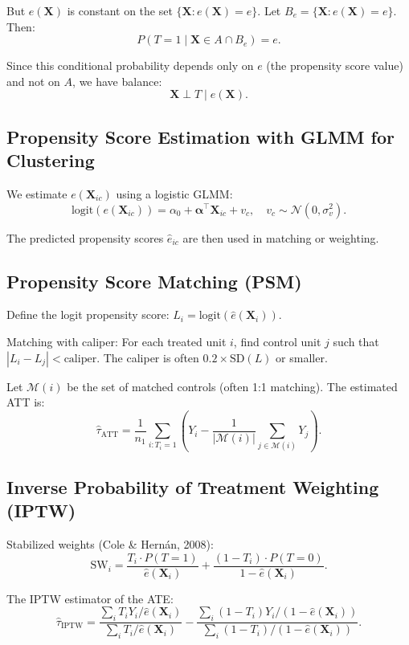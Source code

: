 \documentclass[12pt]{article}
\numberwithin{equation}{section}
\begin{document}
	But $e(\mathbf{X})$ is constant on the set $\{\mathbf{X}: e(\mathbf{X}) = e\}$. Let $B_e = \{\mathbf{X}: e(\mathbf{X}) = e\}$. Then:
	\[
	P(T=1 \mid \mathbf{X} \in A \cap B_e) = e.
	\]
	
	Since this conditional probability depends only on $e$ (the propensity score value) and not on $A$, we have balance:
	\[
	\mathbf{X} \perp T \mid e(\mathbf{X}).
	\]
	
	\subsection{Propensity Score Estimation with GLMM for Clustering}
	
	We estimate $e(\mathbf{X}_{ic})$ using a logistic GLMM:
	\[
	\text{logit}(e(\mathbf{X}_{ic})) = \alpha_0 + \boldsymbol{\alpha}^\top \mathbf{X}_{ic} + v_c, \quad v_c \sim \mathcal{N}(0, \sigma_v^2).
	\]
	
	The predicted propensity scores $\hat{e}_{ic}$ are then used in matching or weighting.
	
	\subsection{Propensity Score Matching (PSM)}
	
	Define the logit propensity score: $L_i = \text{logit}(\hat{e}(\mathbf{X}_i))$.
	
	Matching with caliper: For each treated unit $i$, find control unit $j$ such that $|L_i - L_j| < \text{caliper}$. The caliper is often $0.2 \times \text{SD}(L)$ or smaller.
	
	Let $\mathcal{M}(i)$ be the set of matched controls (often 1:1 matching). The estimated ATT is:
	\[
	\hat{\tau}_{\text{ATT}} = \frac{1}{n_1} \sum_{i:T_i=1} \left( Y_i - \frac{1}{|\mathcal{M}(i)|} \sum_{j \in \mathcal{M}(i)} Y_j \right).
	\]
	
	\subsection{Inverse Probability of Treatment Weighting (IPTW)}
	
	Stabilized weights (Cole \& Hernán, 2008):
	\[
	\text{SW}_i = \frac{T_i \cdot P(T=1)}{\hat{e}(\mathbf{X}_i)} + \frac{(1-T_i) \cdot P(T=0)}{1 - \hat{e}(\mathbf{X}_i)}.
	\]
	
	The IPTW estimator of the ATE:
	\[
	\hat{\tau}_{\text{IPTW}} = \frac{\sum_i T_i Y_i / \hat{e}(\mathbf{X}_i)}{\sum_i T_i / \hat{e}(\mathbf{X}_i)} - \frac{\sum_i (1-T_i) Y_i / (1-\hat{e}(\mathbf{X}_i))}{\sum_i (1-T_i) / (1-\hat{e}(\mathbf{X}_i))}.
	\]
	
\end{document}
